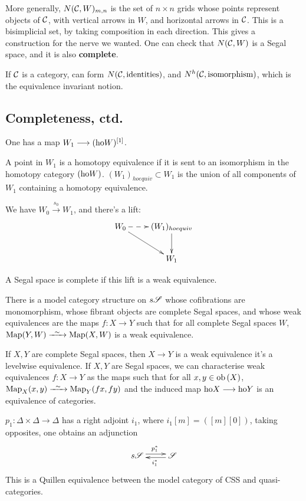 \documentclass[11pt]{article}
\begin{document}
\begin{GeoffroyWeakAssociativityandCompleteSegalSpaces}
More generally, $N(\mathcal{C},W)_{m,n}$ is the set of $n\times n$ grids whose points represent objects of $\mathcal{C}$, with vertical arrows in $W$, and horizontal arrows in $\mathcal{C}$. This is a bisimplicial set, by taking composition in each direction. This gives a construction for the nerve we wanted. One can check that $N(\mathcal{C},W)$ is a Segal space, and it is also \textbf{complete}.

If $\mathcal{C}$ is a category, can form $N(\mathcal{C},\textup{identities})$, and $N^h(\mathcal{C},\textup{isomorphism})$, which is the equivalence invariant notion.
\subsection*{Completeness, ctd.}

One has a map $W_1\longrightarrow(\textup{ho} W)^{[1]}$.
\begin{defn*}
A point in $W_1$ is a homotopy equivalence if it is sent to an isomorphism in the homotopy category $(\textup{ho} W)$. $(W_1)_{hoequiv}\subset W_1$  is the union of all components of $W_1$ containing a homotopy equivalence.
\end{defn*}
We have $W_0\overset{s_0}{\to} W_1$, and there's a lift:
\[\xymatrix{
W_0\ar@{-->}[r]\ar[dr]&(W_1)_{hoequiv}\ar[d]\\
&W_1
}\]
\begin{defn*}
A Segal space is complete if this lift is a weak equivalence.
\end{defn*}
\begin{thm*}[Rezk]
There is a model category structure on $s\mathscr{S}$ whose cofibrations are monomorphism, whose fibrant objects are complete Segal spaces, and whose weak equivalences are the maps $f:X\to Y$ such that for all complete Segal spaces $W$, $\Map(Y,W)\weakequiv\Map(X,W)$ is a weak equivalence.

If $X,Y$ are complete Segal spaces, then $X\to Y$ is a weak equivalence \Iff it's a levelwise equivalence. If $X,Y$ are Segal spaces, we can characterise weak equivalences $f:X\to Y$ as the maps such that for all $x,y\in\textup{ob}\,(X)$, $\Map_X(x,y)\weakequiv\Map_Y(fx,fy)$ and the induced map $\textup{ho} X\longrightarrow\textup{ho} Y$ is an equivalence of categories.
\end{thm*}
\begin{thm*}
$p_1:\Delta\times\Delta\to\Delta$ has a right adjoint $i_1$, where $i_1[m]=([m][0])$, taking opposites, one obtains an adjunction
\[\xymatrix@R=.3cm{
s\scrS  \ar@<.6ex>[r]^{p_1^*}&
\scrS \ar@<.4ex>[l]^{i_1^*}
}\]
This is a Quillen equivalence between the model category of CSS and quasi-categories.
\end{thm*}


\end{GeoffroyWeakAssociativityandCompleteSegalSpaces}
\end{document}
